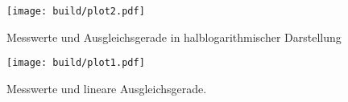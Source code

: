 
\begin{figure}[h]
  \centering
  \texttt{[image: build/plot2.pdf]}
  \caption{Messwerte und Ausgleichsgerade in halblogarithmischer Darstellung}
  \label{fig:plot2}
\end{figure}


\begin{figure}[h]
  \centering
  \texttt{[image: build/plot1.pdf]}
  \caption{Messwerte und lineare Ausgleichsgerade.}
  \label{fig:plot1}
\end{figure}




